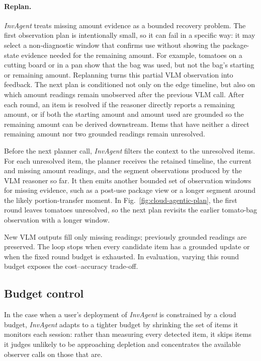 \documentclass[sigconf,anonymous,nonacm]{acmart}
\newcommand{\sys}{\textit{InvAgent}\xspace}
\begin{document}
\paragraph{Replan.}
\sys treats missing amount evidence as a bounded recovery problem. The
first observation plan is intentionally small, so it can fail in a
specific way: it may select a non-diagnostic window that confirms use
without showing the package-state evidence needed for the remaining
amount. For example, tomatoes on a cutting board or in a pan show that
the bag was used, but not the bag's starting or remaining amount.
Replanning turns this partial VLM
observation into feedback. The next plan is conditioned not only on the
edge timeline, but also on which amount readings remain unobserved after
the previous VLM call. After each round, an item is resolved if the
reasoner directly reports a remaining amount, or if both the starting
amount and amount used are grounded so the remaining amount can be
derived downstream. Items that have neither a direct remaining amount nor
two grounded readings remain unresolved.

Before the next planner call, \sys filters the context to the
unresolved items.
For each unresolved item, the planner receives the retained timeline,
the current and missing amount readings, and the segment observations
produced by the VLM reasoner so far. It then emits another bounded set
of observation windows for missing evidence, such as a post-use package
view or a longer segment around the likely portion-transfer moment. In
Fig.~\ref{fig:cloud-agentic-plan}, the first round leaves tomatoes
unresolved, so the next plan revisits the earlier tomato-bag observation
with a longer window.

New VLM outputs fill only missing readings; previously grounded readings
are preserved.
The loop stops when every candidate item has a grounded update or when the
fixed round budget is exhausted. In evaluation, varying this round budget
exposes the cost--accuracy trade-off.

\subsection{Budget control}
\label{sec:budget-control}

In the case when a user's deployment of \sys is constrained by a cloud budget, \sys adapts to a tighter budget by shrinking the set of items it monitors each session: rather than measuring every detected item, it skips items it judges unlikely to be approaching depletion and concentrates the available observer calls on those that are.
\end{document}
